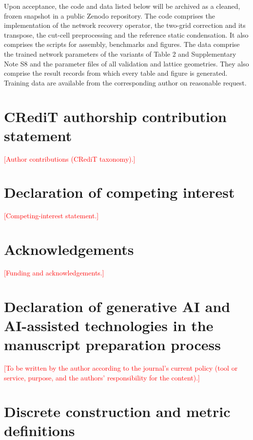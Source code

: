 \documentclass[preprint,12pt,authoryear]{elsarticle}
\begin{document}
Upon acceptance, the code and data listed below will be archived as a cleaned, frozen snapshot in a public Zenodo repository. The code comprises the implementation of the network recovery operator, the two-grid correction and its transpose, the cut-cell preprocessing and the reference static condensation. It also comprises the scripts for assembly, benchmarks and figures. The data comprise the trained network parameters of the variants of Table 2 and Supplementary Note S8 and the parameter files of all validation and lattice geometries. They also comprise the result records from which every table and figure is generated. Training data are available from the corresponding author on reasonable request.

\section*{CRediT authorship contribution statement}
\textcolor{red}{[Author contributions (CRediT taxonomy).]}

\section*{Declaration of competing interest}
\textcolor{red}{[Competing-interest statement.]}

\section*{Acknowledgements}
\textcolor{red}{[Funding and acknowledgements.]}

\section*{Declaration of generative AI and AI-assisted technologies in the manuscript preparation process}
\textcolor{red}{[To be written by the author according to the journal's current policy (tool or service, purpose, and the
authors' responsibility for the content).]}


\appendix
\section{Discrete construction and metric definitions}
\end{document}
